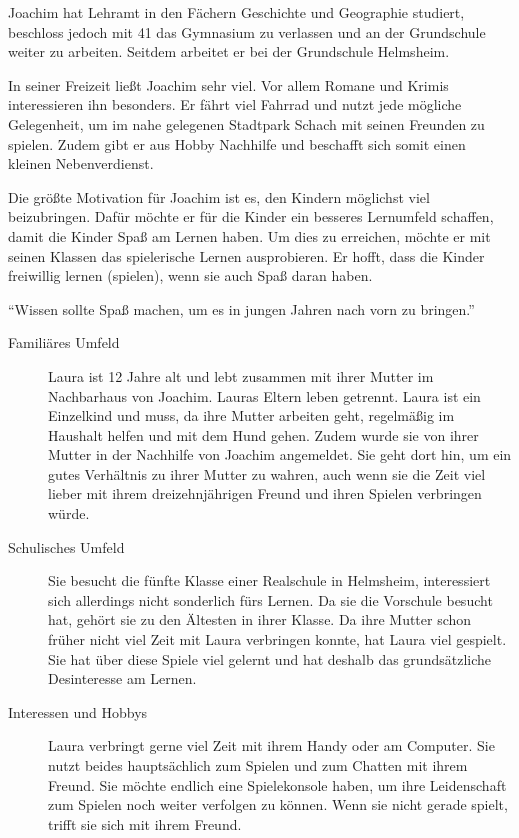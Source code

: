 \begin{description}
\begin{description}
			\item[Schulisches Umfeld]{Joachim hat Lehramt in den Fächern Geschichte und Geographie studiert, beschloss jedoch mit 41 das Gymnasium zu verlassen und an der Grundschule weiter zu arbeiten. Seitdem arbeitet er bei der Grundschule Helmsheim.}
			\item[Interessen und Hobbys]{In seiner Freizeit ließt Joachim sehr viel. Vor allem Romane und Krimis interessieren ihn besonders. Er fährt viel Fahrrad und nutzt jede mögliche Gelegenheit, um im nahe gelegenen Stadtpark Schach mit seinen Freunden zu spielen. Zudem gibt er aus Hobby Nachhilfe und beschafft sich somit einen kleinen Nebenverdienst.}
			\item[Motivation]{Die größte Motivation für Joachim ist es, den Kindern möglichst viel beizubringen. Dafür möchte er für die Kinder ein besseres Lernumfeld schaffen, damit die Kinder Spaß am Lernen haben. Um dies zu erreichen, möchte er mit seinen Klassen das spielerische Lernen ausprobieren. Er hofft, dass die Kinder freiwillig lernen (spielen), wenn sie auch Spaß daran haben.}
			\item{\enquote{Wissen sollte Spaß machen, um es in jungen Jahren nach vorn zu bringen.}}
		\end{description}
		\item[Laura Dietz: Die Rennfahrerin]\hfill
		\begin{description}
			\item[Familiäres Umfeld]{Laura ist 12 Jahre alt und lebt zusammen mit ihrer Mutter im Nachbarhaus von Joachim. Lauras Eltern leben getrennt. Laura ist ein Einzelkind und muss, da ihre Mutter arbeiten geht, regelmäßig im Haushalt helfen und mit dem Hund gehen. Zudem wurde sie von ihrer Mutter in der Nachhilfe von Joachim angemeldet. Sie geht dort hin, um ein gutes Verhältnis zu ihrer Mutter zu wahren, auch wenn sie die Zeit viel lieber mit ihrem dreizehnjährigen Freund und ihren Spielen verbringen würde.}
			\item[Schulisches Umfeld]{Sie besucht die fünfte Klasse einer Realschule in Helmsheim, interessiert sich allerdings nicht sonderlich fürs Lernen. Da sie die Vorschule besucht hat, gehört sie zu den Ältesten in ihrer Klasse. Da ihre Mutter schon früher nicht viel Zeit mit Laura verbringen konnte, hat Laura viel gespielt. Sie hat über diese Spiele viel gelernt und hat deshalb das grundsätzliche Desinteresse am Lernen.}
			\item[Interessen und Hobbys]{Laura verbringt gerne viel Zeit mit ihrem Handy oder am Computer. Sie nutzt beides hauptsächlich zum Spielen und zum Chatten mit ihrem Freund. Sie möchte endlich eine Spielekonsole haben, um ihre Leidenschaft zum Spielen noch weiter verfolgen zu können. Wenn sie nicht gerade spielt, trifft sie sich mit ihrem Freund.}

\end{description}
\end{description}
